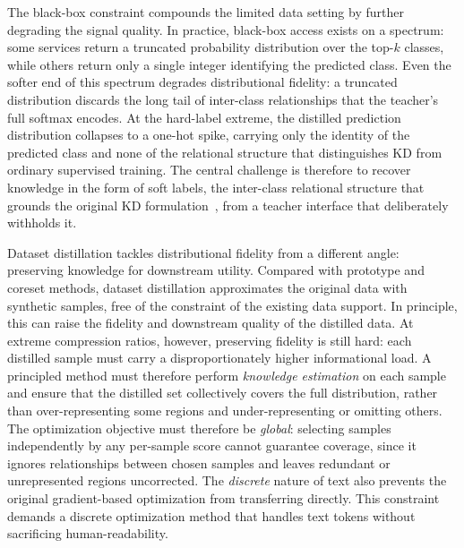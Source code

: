 \begin{foldable}
  The black-box constraint compounds the limited data setting by further degrading the signal quality.
  In practice, black-box access exists on a spectrum: some services return a truncated probability distribution over the top-$k$ classes, while others return only a single integer identifying the predicted class.
  Even the softer end of this spectrum degrades distributional fidelity: a truncated distribution discards the long tail of inter-class relationships that the teacher's full softmax encodes.
  At the hard-label extreme, the distilled prediction distribution collapses to a one-hot spike, carrying only the identity of the predicted class and none of the relational structure that distinguishes \ac{KD} from ordinary supervised training.
  The central challenge is therefore to recover knowledge in the form of soft labels, the inter-class relational structure that grounds the original \ac{KD} formulation~\cite{hinton2015distilling}, from a teacher interface that deliberately withholds it.
\end{foldable}

\begin{foldable}
  Dataset distillation tackles distributional fidelity from a different angle: preserving knowledge for downstream utility.
  Compared with prototype and coreset methods, dataset distillation approximates the original data with synthetic samples, free of the constraint of the existing data support.
  In principle, this can raise the fidelity and downstream quality of the distilled data.
  At extreme compression ratios, however, preserving fidelity is still hard: each distilled sample must carry a disproportionately higher informational load.
  A principled method must therefore perform \textit{knowledge estimation} on each sample and ensure that the distilled set collectively covers the full distribution, rather than over-representing some regions and under-representing or omitting others.
  The optimization objective must therefore be \textit{global}: selecting samples independently by any per-sample score cannot guarantee coverage, since it ignores relationships between chosen samples and leaves redundant or unrepresented regions uncorrected.
  The \textit{discrete} nature of text also prevents the original gradient-based optimization from transferring directly.
  This constraint demands a discrete optimization method that handles text tokens without sacrificing human-readability.
\end{foldable}

